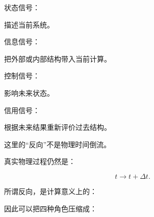 状态信号：

\begin{statementbox}
\centering
{}
\end{statementbox}

描述当前系统。

信息信号：

\begin{statementbox}
\centering
{}
\end{statementbox}

把外部或内部结构带入当前计算。

控制信号：

\begin{statementbox}
\centering
{}
\end{statementbox}

影响未来状态。

信用信号：

\begin{statementbox}
\centering
{}
\end{statementbox}

根据未来结果重新评价过去结构。

这里的“反向”不是物理时间倒流。

真实物理过程仍然是：

\[
t\rightarrow t+\Delta t.
\]

所谓反向，是计算意义上的：

\begin{statementbox}
\centering
{}
\end{statementbox}

因此可以把四种角色压缩成：

\begin{statementbox}
\centering
{}
\end{statementbox}

\begin{statementbox}
\centering
{}
\end{statementbox}

\begin{statementbox}
\centering
{}
\end{statementbox}


